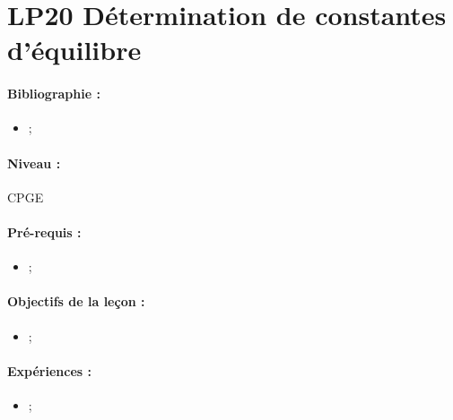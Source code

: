 \section{LP20 Détermination de constantes d'équilibre}

\paragraph{Bibliographie :}
\begin{itemize}
\item ;
\end{itemize}

\paragraph{Niveau :} CPGE

\paragraph{Pré-requis :}
\begin{itemize}
\item ;
\end{itemize}

\paragraph{Objectifs de la leçon :}
\begin{itemize}
\item ;
\end{itemize}

\paragraph{Expériences :}
\begin{itemize}
\item ;
\end{itemize}